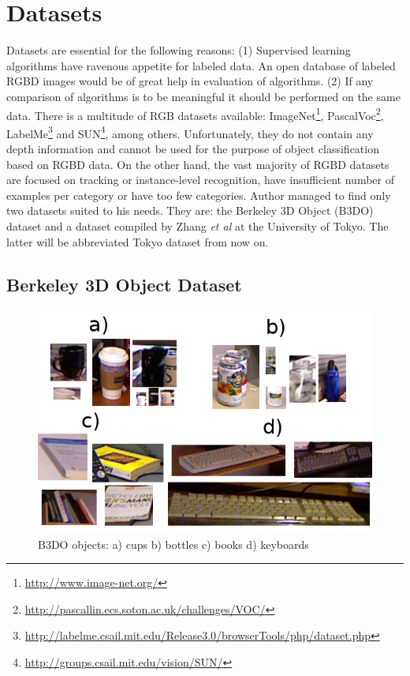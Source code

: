 \documentclass[12pt]{article}
\begin{document}
\section{ Datasets}

  Datasets are essential for the following reasons: (1) Supervised learning 
algorithms have ravenous appetite for labeled data. An open database of labeled 
RGBD images would be of great help in evaluation of algorithms. (2) If any 
comparison of algorithms is to be meaningful it should be performed on the same 
data. There is a multitude of RGB datasets available: 
ImageNet\footnote{\url{http://www.image-net.org/}}, 
PascalVoc\footnote{\url{http://pascallin.ecs.soton.ac.uk/challenges/VOC/}}, 
LabelMe\footnote{\url{
http://labelme.csail.mit.edu/Release3.0/browserTools/php/dataset.php}} and 
SUN\footnote{\url{http://groups.csail.mit.edu/vision/SUN/}}, among others. 
Unfortunately, they do not contain any depth information and cannot be used for 
the purpose of object classification based on RGBD data. On the other hand, the 
vast majority of RGBD datasets are focused on tracking or instance-level 
recognition, have insufficient number of examples per category or have too few 
categories. Author managed to find only two datasets suited to his needs. They 
are: the Berkeley 3D Object (B3DO) dataset \cite{B3DO} and a dataset compiled 
by Zhang \emph{et al} at the University of Tokyo\cite{zhangcategory}. The 
latter will be abbreviated Tokyo dataset from now on.

  \subsection{Berkeley 3D Object Dataset}
    \begin{figure}[!ht]
    \centering	
    \includegraphics[width=.75\textwidth]{figs/b3do_objects}
    \caption{B3DO objects: a) cups b) bottles c) books d) keyboards}
    \label{fig:b3do_objects}
    \end{figure}    
    
\end{document}
